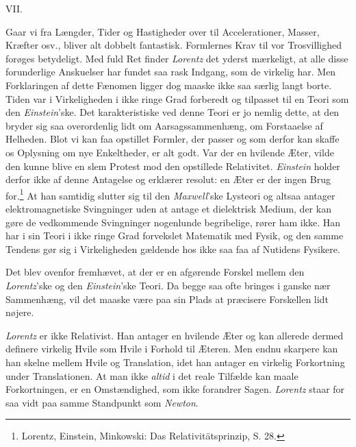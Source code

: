 \documentclass[12pt,a4paper]{article}
\newcommand{\opage}[1]{\marginnote{\footnotesize\textit{[#1]}}}
\begin{document}
\begin{center}
VII.
\end{center}

Gaar vi fra Længder, Tider og Hastigheder over til Accelerationer, Masser,
Kræfter osv., bliver alt dobbelt fantastisk. Formlernes Krav til vor
Trosvillighed forøges betydeligt. Med fuld Ret finder \emph{Lorentz} det
yderst mærkeligt, at alle disse forunderlige Anskuelser har fundet saa rask
Indgang, som de virkelig har. Men Forklaringen af dette Fænomen ligger dog
maaske ikke saa særlig langt borte. Tiden var i Virkeligheden i ikke ringe Grad
forberedt og tilpasset til en Teori som den \emph{Einstein}'ske. Det
karakteristiske ved denne Teori er jo nemlig dette, at den bryder sig saa
overordenlig lidt om Aarsagssammenhæng, om Forstaaelse af Helheden. Blot vi kan
faa opstillet Formler, \guillemotright der passer\guillemotleft{} og som derfor
kan skaffe os Oplysning om nye Enkeltheder, er alt godt. Var der en hvilende
Æter, vilde den kunne blive en slem Protest mod den opstillede Relativitet.
\emph{Einstein} holder derfor ikke af denne Antagelse og erklærer resolut: en
Æter er der ingen Brug for.\footnote{Lorentz, Einstein, Minkowski: Das
Relativitätsprinzip, S. 28.} At han samtidig slutter sig til den
\emph{Maxwell}'ske Lysteori og altsaa antager elektromagnetiske Svingninger
uden at antage et dielektrisk Medium, der kan gøre de vedkommende Svingninger
nogenlunde begribelige, rører ham ikke. Han har i sin Teori i ikke ringe Grad
forvekslet Matematik med Fysik, og den samme Tendens gør sig i Virkeligheden
gældende hos ikke saa faa af Nutidens Fysikere.

Det blev ovenfor fremhævet, at der er en afgørende Forskel mellem den
\emph{Lorentz}'ske og den \emph{Einstein}'ske Teori. Da begge saa ofte bringes
i ganske nær Sammenhæng, vil det maaske være paa sin Plads at præcisere
Forskellen lidt nøjere.

\opage{30} \emph{Lorentz} er ikke Relativist. Han antager en hvilende Æter og kan allerede
dermed definere virkelig Hvile som Hvile i Forhold til Æteren. Men endnu
skarpere kan han skelne mellem Hvile og Translation, idet han antager en
virkelig Forkortning under Translationen. At man ikke \emph{altid} i det reale
Tilfælde kan maale Forkortningen, er en Omstændighed, som ikke forandrer Sagen.
\emph{Lorentz} staar for saa vidt paa samme Standpunkt som \emph{Newton}.
\end{document}
